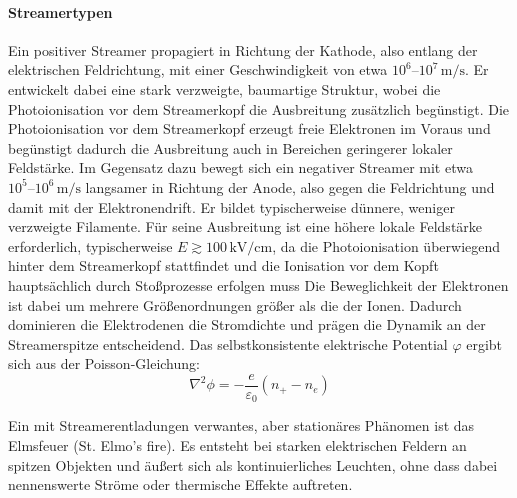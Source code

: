 
\paragraph{Streamertypen}
Ein positiver Streamer propagiert in Richtung der Kathode, also entlang der elektrischen Feldrichtung, mit einer Geschwindigkeit von etwa $10^{6}\text{–}10^{7}\,\mathrm{m/s}$. Er entwickelt dabei eine stark verzweigte, baumartige Struktur, wobei die Photoionisation vor dem Streamerkopf die Ausbreitung zusätzlich begünstigt. Die Photoionisation vor dem Streamerkopf erzeugt freie Elektronen im Voraus und begünstigt dadurch die Ausbreitung auch in Bereichen geringerer lokaler Feldstärke.
Im Gegensatz dazu bewegt sich ein negativer Streamer mit etwa $10^{5}\text{–}10^{6}\,\mathrm{m/s}$ langsamer in Richtung der Anode, also gegen die Feldrichtung und damit mit der Elektronendrift. Er bildet typischerweise dünnere, weniger verzweigte Filamente. Für seine Ausbreitung ist eine höhere lokale Feldstärke erforderlich, typischerweise $E \gtrsim 100\,\mathrm{kV/cm}$, da die Photoionisation überwiegend hinter dem Streamerkopf stattfindet und die Ionisation vor dem Kopft hauptsächlich durch Stoßprozesse erfolgen muss
Die Beweglichkeit der Elektronen ist dabei um mehrere Größenordnungen größer als die der Ionen. Dadurch dominieren die Elektrodenen die Stromdichte und prägen die Dynamik an der Streamerspitze entscheidend.
Das selbstkonsistente elektrische Potential \(\varphi\) ergibt sich aus der Poisson-Gleichung:
\begin{equation}
    \nabla^2 \phi = -\frac{e}{\varepsilon_0}(n_+ - n_e)
\end{equation}

Ein mit Streamerentladungen verwantes, aber stationäres Phänomen ist das Elmsfeuer (St. Elmo's fire). Es entsteht bei starken elektrischen Feldern an spitzen Objekten und äußert sich als kontinuierliches Leuchten, ohne dass dabei nennenswerte Ströme oder thermische Effekte auftreten.

